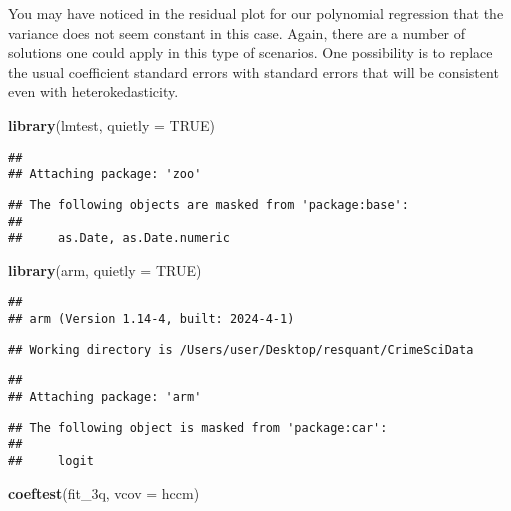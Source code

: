 \documentclass[
]{book}
\newenvironment{Shaded}{\begin{snugshade}}{\end{snugshade}}
\newcommand{\AttributeTok}[1]{\textcolor[rgb]{0.13,0.29,0.53}{#1}}
\newcommand{\ConstantTok}[1]{\textcolor[rgb]{0.56,0.35,0.01}{#1}}
\newcommand{\FunctionTok}[1]{\textcolor[rgb]{0.13,0.29,0.53}{\textbf{#1}}}
\newcommand{\NormalTok}[1]{#1}
\begin{document}
You may have noticed in the residual plot for our polynomial regression that the variance does not seem constant in this case. Again, there are a number of solutions one could apply in this type of scenarios. One possibility is to replace the usual coefficient standard errors with standard errors that will be consistent even with heterokedasticity.

\begin{Shaded}
\begin{Highlighting}[]
\FunctionTok{library}\NormalTok{(lmtest, }\AttributeTok{quietly =} \ConstantTok{TRUE}\NormalTok{)}
\end{Highlighting}
\end{Shaded}

\begin{verbatim}
## 
## Attaching package: 'zoo'
\end{verbatim}

\begin{verbatim}
## The following objects are masked from 'package:base':
## 
##     as.Date, as.Date.numeric
\end{verbatim}

\begin{Shaded}
\begin{Highlighting}[]
\FunctionTok{library}\NormalTok{(arm, }\AttributeTok{quietly =} \ConstantTok{TRUE}\NormalTok{)}
\end{Highlighting}
\end{Shaded}

\begin{verbatim}
## 
## arm (Version 1.14-4, built: 2024-4-1)
\end{verbatim}

\begin{verbatim}
## Working directory is /Users/user/Desktop/resquant/CrimeSciData
\end{verbatim}

\begin{verbatim}
## 
## Attaching package: 'arm'
\end{verbatim}

\begin{verbatim}
## The following object is masked from 'package:car':
## 
##     logit
\end{verbatim}

\begin{Shaded}
\begin{Highlighting}[]
\FunctionTok{coeftest}\NormalTok{(fit\_3q, }\AttributeTok{vcov =}\NormalTok{ hccm)}
\end{Highlighting}
\end{Shaded}
\end{document}
